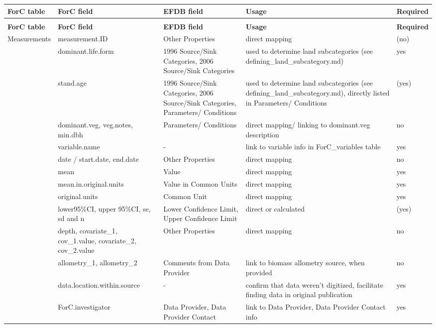 \documentclass[, manuscript]{copernicus}
\begin{document}
\begin{longtabu} to 
\hline
\textbf{ForC table} & \textbf{ForC field} & \textbf{EFDB field} & \textbf{Usage} & \textbf{Required}\\
\hline
\endfirsthead
{}\\
\hline
\textbf{ForC table} & \textbf{ForC field} & \textbf{EFDB field} & \textbf{Usage} & \textbf{Required}\\
\hline
\endhead
Measurements & measurement.ID & Other Properties & direct mapping & (no)\\
\hline
 & dominant.life.form & 1996 Source/Sink Categories, 2006 Source/Sink Categories & used to determine land subcategories (see defining\_land\_subcategory.md) & yes\\
\hline
 & stand.age & 1996 Source/Sink Categories, 2006 Source/Sink Categories, Parameters/ Conditions & used to determine land subcategories (see defining\_land\_subcategory.md), directly listed in Parameters/ Conditions & (yes)\\
\hline
 & dominant.veg, veg.notes, min.dbh & Parameters/ Conditions & direct mapping/ linking to dominant.veg description & no\\
\hline
 & variable.name & - & link to variable info in ForC\_variables table & yes\\
\hline
 & date / start.date, end.date & Other Properties & direct mapping & no\\
\hline
 & mean & Value & direct mapping & yes\\
\hline
 & mean.in.original.units & Value in Common Units & direct mapping & yes\\
\hline
 & original.units & Common Unit & direct mapping & yes\\
\hline
 & lower95\%CI, upper 95\%CI, se, sd and n & Lower Confidence Limit, Upper Confidence Limit & direct or calculated & (yes)\\
\hline
 & depth, covariate\_1, cov\_1.value, covariate\_2, cov\_2.value & Other Properties & direct mapping & no\\
\hline
 & allometry\_1, allometry\_2 & Comments from Data Provider & link to biomass allometry source, when provided & no\\
\hline
 & data.location.within.source & - & confirm that data weren't digitized, facilitate finding data in original publication & yes\\
\hline
 & ForC.investigator & Data Provider, Data Provider Contact & link to Data Provider, Data Provider Contact info & yes\\

\end{longtabu}
\end{document}

